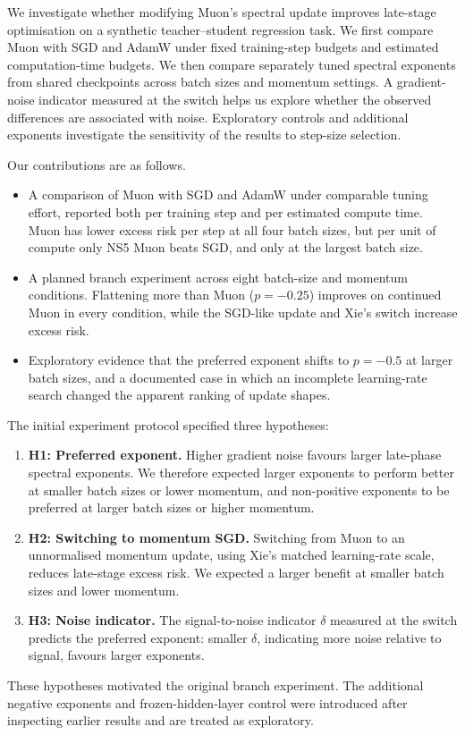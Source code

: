 \documentclass[11pt,a4paper]{article}
\begin{document}
We investigate whether modifying Muon's spectral update improves late-stage optimisation on a synthetic teacher--student regression task. We first compare Muon with SGD and AdamW under fixed training-step budgets and estimated computation-time budgets. We then compare separately tuned spectral exponents from shared checkpoints across batch sizes and momentum settings. A gradient-noise indicator measured at the switch helps us explore whether the observed differences are associated with noise. Exploratory controls and additional exponents investigate the sensitivity of the results to step-size selection.

Our contributions are as follows.
\begin{itemize}
    \item A comparison of Muon with SGD and AdamW under comparable tuning effort, reported both per training step and per estimated compute time. Muon has lower excess risk per step at all four batch sizes, but per unit of compute only NS5 Muon beats SGD, and only at the largest batch size.
    \item A planned branch experiment across eight batch-size and momentum conditions. Flattening more than Muon ($p=-0.25$) improves on continued Muon in every condition, while the SGD-like update and Xie's switch increase excess risk.
    \item Exploratory evidence that the preferred exponent shifts to $p=-0.5$ at larger batch sizes, and a documented case in which an incomplete learning-rate search changed the apparent ranking of update shapes.
\end{itemize}

The initial experiment protocol specified three hypotheses:
\begin{enumerate}
    \item \textbf{H1: Preferred exponent.} Higher gradient noise favours larger late-phase spectral exponents. We therefore expected larger exponents to perform better at smaller batch sizes or lower momentum, and non-positive exponents to be preferred at larger batch sizes or higher momentum.

    \item \textbf{H2: Switching to momentum SGD.} Switching from Muon to an unnormalised momentum update, using Xie's matched learning-rate scale, reduces late-stage excess risk. We expected a larger benefit at smaller batch sizes and lower momentum.

    \item \textbf{H3: Noise indicator.} The signal-to-noise indicator $\delta$ measured at the switch predicts the preferred exponent: smaller $\delta$, indicating more noise relative to signal, favours larger exponents.
\end{enumerate}
These hypotheses motivated the original branch experiment. The additional negative exponents and frozen-hidden-layer control were introduced after inspecting earlier results and are treated as exploratory.
\end{document}
